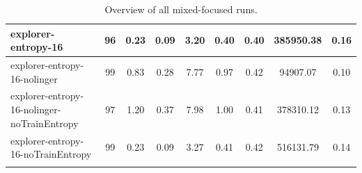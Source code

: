\begin{table}
\begin{longtable}{|l|c|c|c|c|c|c|c|c|}
        explorer-entropy-16 & 96 & {\cellcolor[HTML]{E3EFEC}} \color[HTML]{000000} 0.23 & {\cellcolor[HTML]{EBF2F0}} \color[HTML]{000000} 0.09 & {\cellcolor[HTML]{B0D6CE}} \color[HTML]{000000} 3.20 & {\cellcolor[HTML]{BBDBD5}} \color[HTML]{000000} 0.40 & 0.40 & 385950.38 & {\cellcolor[HTML]{55AA99}} \color[HTML]{F1F1F1} 0.16 \\ \hline
        explorer-entropy-16-nolinger & 99 & {\cellcolor[HTML]{B4D8D0}} \color[HTML]{000000} 0.83 & {\cellcolor[HTML]{88C3B7}} \color[HTML]{000000} 0.28 & {\cellcolor[HTML]{59AC9B}} \color[HTML]{F1F1F1} 7.77 & {\cellcolor[HTML]{59AC9B}} \color[HTML]{F1F1F1} 0.97 & 0.42 & 94907.07 & {\cellcolor[HTML]{EBF2F0}} \color[HTML]{000000} 0.10 \\ \hline
        explorer-entropy-16-nolinger-noTrainEntropy & 97 & {\cellcolor[HTML]{97CABF}} \color[HTML]{000000} 1.20 & {\cellcolor[HTML]{55AA99}} \color[HTML]{F1F1F1} 0.37 & {\cellcolor[HTML]{55AA99}} \color[HTML]{F1F1F1} 7.98 & {\cellcolor[HTML]{55AA99}} \color[HTML]{F1F1F1} 1.00 & 0.41 & 378310.12 & {\cellcolor[HTML]{D1E5E1}} \color[HTML]{000000} 0.13 \\ \hline
        explorer-entropy-16-noTrainEntropy & 99 & {\cellcolor[HTML]{E3EEEC}} \color[HTML]{000000} 0.23 & {\cellcolor[HTML]{EBF2F0}} \color[HTML]{000000} 0.09 & {\cellcolor[HTML]{AFD5CD}} \color[HTML]{000000} 3.27 & {\cellcolor[HTML]{BADAD4}} \color[HTML]{000000} 0.41 & 0.42 & 516131.79 & {\cellcolor[HTML]{97CABF}} \color[HTML]{000000} 0.14 \\ \hline
    
        \caption{Overview of all mixed-focused runs. \label{tab:RQ1-results-mixedFocusedRuns}}
    \end{longtable}

\end{table}


